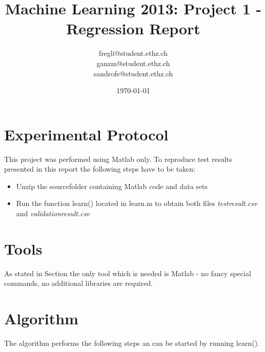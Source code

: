 \documentclass[a4paper, 11pt]{article}
\title{Machine Learning 2013: Project 1 - Regression Report}
\author{fregli@student.ethz.ch\\ ganzm@student.ethz.ch\\ sandrofe@student.ethz.ch\\}
\date{\today}
\begin{document}
\maketitle

\section*{Experimental Protocol}
\label{sec:exp-protocl}

This project was performed using Matlab only. To reproduce test results presented in this report the following steps have to be taken:

\begin{itemize}
\item Unzip the sourcefolder containing Matlab code and data sets
\item Run the function learn() located in learn.m to obtain both files \textit{testresult.csv} and \textit{validationresult.csv}
\end{itemize}

\section{Tools}

As stated in Section  the only tool which is needed is Matlab - no fancy special commands, no additional libraries are required.

\section{Algorithm}

The algorithm performs the following steps an can be started by running learn().
\end{document}
